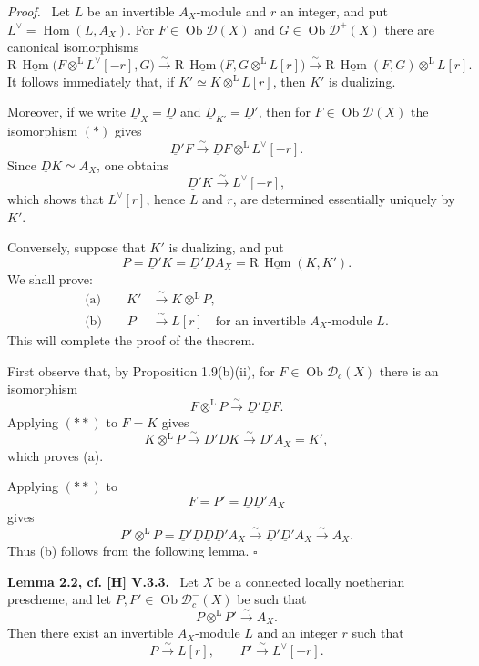 \documentclass[11pt]{article}
\theoremstyle{plain}
\theoremstyle{definition}
\theoremstyle{remark}
\newenvironment{statement}[1]{\par\medskip\noindent\textbf{#1.}\ }{\par\medskip}
\newenvironment{prooftext}{\par\noindent\textit{Proof.}\ }{\par\medskip}
\newcommand{\D}{\mathcal D}\newcommand{\E}{\mathcal E}\newcommand{\F}{\mathcal F}
\DeclareMathOperator{\Hom}{Hom}
\DeclareMathOperator{\ob}{Ob}
\newcommand{\R}{\mathrm R}
\newcommand{\qedtext}{\hfill$\square$}
\begin{document}
\begin{prooftext}
Let $L$ be an invertible $A_X$-module and $r$ an integer, and put $L^\vee=\underline{\Hom}(L,A_X)$. For $F\in\ob\D(X)$ and $G\in\ob\D^+(X)$ there are canonical isomorphisms
\[
\R\,\underline{\Hom}\bigl(F\otimes^{\mathrm L}L^\vee[-r],G\bigr)
   \xrightarrow{\sim}
\R\,\underline{\Hom}\bigl(F,G\otimes^{\mathrm L}L[r]\bigr)
   \xrightarrow{\sim}
\R\,\underline{\Hom}(F,G)\otimes^{\mathrm L}L[r]. \tag{*}
\]
It follows immediately that, if $K'\simeq K\otimes^{\mathrm L}L[r]$, then $K'$ is dualizing.

Moreover, if we write $\underline D_X=\underline D$ and $\underline D_{K'}=\underline D'$, then for $F\in\ob\D(X)$ the isomorphism $(*)$ gives
\[
   \underline D'F\xrightarrow{\sim}\underline DF\otimes^{\mathrm L}L^\vee[-r].
\]
Since $\underline DK\simeq A_X$, one obtains
\[
   \underline D'K\xrightarrow{\sim}L^\vee[-r],
\]
which shows that $L^\vee[r]$, hence $L$ and $r$, are determined essentially uniquely by $K'$.

Conversely, suppose that $K'$ is dualizing, and put
\[
   P=\underline D'K=\underline D'\underline DA_X=\R\,\underline{\Hom}(K,K').
\]
We shall prove:
\begin{align*}
\text{(a)}\qquad K'&\xrightarrow{\sim}K\otimes^{\mathrm L}P,\\
\text{(b)}\qquad P&\xrightarrow{\sim}L[r]\quad\text{for an invertible }A_X\text{-module }L.
\end{align*}
This will complete the proof of the theorem.

First observe that, by Proposition 1.9(b)(ii), for $F\in\ob\D_c(X)$ there is an isomorphism
\[
   F\otimes^{\mathrm L}P\xrightarrow{\sim}\underline D'\underline DF. \tag{**}
\]
Applying $(**)$ to $F=K$ gives
\[
   K\otimes^{\mathrm L}P\xrightarrow{\sim}\underline D'\underline DK\xrightarrow{\sim}\underline D'A_X=K',
\]
which proves (a).

Applying $(**)$ to
\[
   F=P'=\underline D\underline D'A_X
\]
gives
\[
   P'\otimes^{\mathrm L}P
      =\underline D'\underline D\underline D\underline D'A_X
      \xrightarrow{\sim}\underline D'\underline D'A_X
      \xrightarrow{\sim}A_X.
\]
Thus (b) follows from the following lemma. \qedtext
\end{prooftext}

\begin{statement}{Lemma 2.2, cf. [H] V.3.3}
Let $X$ be a connected locally noetherian prescheme, and let $P,P'\in\ob\D_c^-(X)$ be such that
\[
   P\otimes^{\mathrm L}P'\xrightarrow{\sim}A_X.
\]
Then there exist an invertible $A_X$-module $L$ and an integer $r$ such that
\[
   P\xrightarrow{\sim}L[r],\qquad P'\xrightarrow{\sim}L^\vee[-r].
\]
\end{statement}
\end{document}
